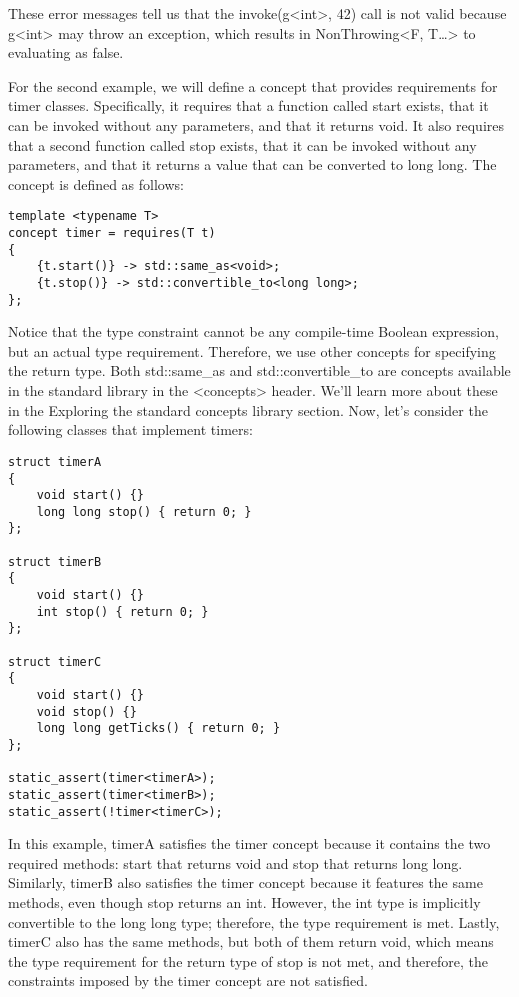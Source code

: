 These error messages tell us that the invoke(g<int>, 42) call is not valid because g<int> may throw an exception, which results in NonThrowing<F, T…> to evaluating as false.

For the second example, we will define a concept that provides requirements for timer classes. Specifically, it requires that a function called start exists, that it can be invoked without any parameters, and that it returns void. It also requires that a second function called stop exists, that it can be invoked without any parameters, and that it returns a value that can be converted to long long. The concept is defined as follows:

\begin{lstlisting}[style=styleCXX]
template <typename T>
concept timer = requires(T t)
{
	{t.start()} -> std::same_as<void>;
	{t.stop()} -> std::convertible_to<long long>;
};
\end{lstlisting}

Notice that the type constraint cannot be any compile-time Boolean expression, but an actual type requirement. Therefore, we use other concepts for specifying the return type. Both std::same\_as and std::convertible\_to are concepts available in the standard library in the <concepts> header. We’ll learn more about these in the Exploring the standard concepts library section. Now, let’s consider the following classes that implement timers:

\begin{lstlisting}[style=styleCXX]
struct timerA
{
	void start() {}
	long long stop() { return 0; }
};

struct timerB
{
	void start() {}
	int stop() { return 0; }
};

struct timerC
{
	void start() {}
	void stop() {}
	long long getTicks() { return 0; }
};

static_assert(timer<timerA>);
static_assert(timer<timerB>);
static_assert(!timer<timerC>);
\end{lstlisting}

In this example, timerA satisfies the timer concept because it contains the two required methods: start that returns void and stop that returns long long. Similarly, timerB also satisfies the timer concept because it features the same methods, even though stop returns an int. However, the int type is implicitly convertible to the long long type; therefore, the type requirement is met. Lastly, timerC also has the same methods, but both of them return void, which means the type requirement for the return type of stop is not met, and therefore, the constraints imposed by the timer concept are not satisfied.

